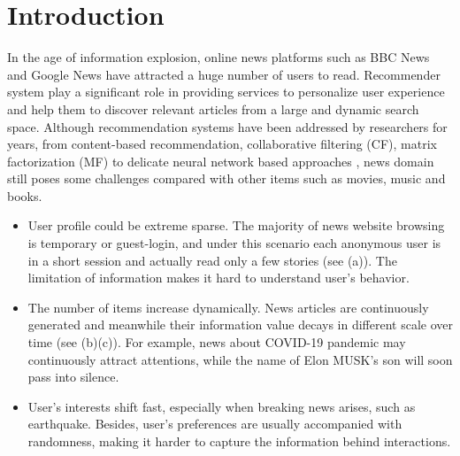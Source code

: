 \section{Introduction}
In the age of information explosion, online news platforms such as BBC News and Google News have attracted a huge number of users to read. Recommender system play a significant role in providing services to personalize user experience and help them to discover relevant articles from a large and dynamic search space. Although recommendation systems have been addressed by researchers for years, from content-based recommendation, collaborative filtering (CF), matrix factorization (MF) \cite{rendle_factorization_2012} to delicate neural network based approaches \cite{xin_cfm_2019}, news domain still poses some challenges compared with other items such as movies, music and books.
\begin{itemize}
    \item User profile could be extreme sparse. The majority of news website browsing is temporary or guest-login, and under this scenario each anonymous user is in a short session and actually read only a few stories (see (a)). The limitation of information makes it hard to understand user's behavior.
    \item The number of items increase dynamically. News articles are continuously generated and meanwhile their information value decays in different scale over time (see (b)(c)). For example, news about COVID-19 pandemic may continuously attract attentions, while the name of Elon MUSK's son will soon pass into silence.
    \item User's interests shift fast, especially when breaking news arises, such as earthquake. Besides, user's preferences are usually accompanied with randomness, making it harder to capture the information behind interactions.
\end{itemize}

